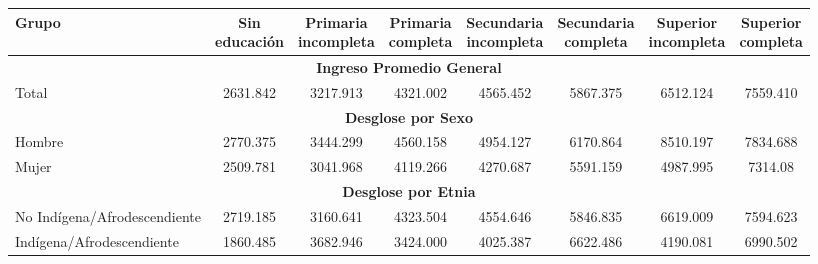 \begin{tabular}{lccccccc}
\toprule
\textbf{Grupo} & \makecell{\textbf{Sin} \\ \textbf{educación}} & \makecell{\textbf{Primaria} \\ \textbf{incompleta}} & \makecell{\textbf{Primaria} \\ \textbf{completa}} & \makecell{\textbf{Secundaria} \\ \textbf{incompleta}} & \makecell{\textbf{Secundaria} \\ \textbf{completa}} & \makecell{\textbf{Superior} \\ \textbf{incompleta}} & \makecell{\textbf{Superior} \\ \textbf{completa}} \\
\midrule
\multicolumn{8}{c}{\textbf{Ingreso Promedio General}} \\
\midrule
Total & 2631.842 & 3217.913 & 4321.002 & 4565.452 & 5867.375 & 6512.124 & 7559.410 \\
\midrule
\multicolumn{8}{c}{\textbf{Desglose por Sexo}} \\
\midrule
Hombre & 2770.375 & 3444.299 & 4560.158 & 4954.127 & 6170.864 & 8510.197 & 7834.688 \\
Mujer & 2509.781 & 3041.968 & 4119.266 & 4270.687 & 5591.159 & 4987.995 & 7314.08 \\
\midrule
\multicolumn{8}{c}{\textbf{Desglose por Etnia}} \\
\midrule
No Indígena/Afrodescendiente & 2719.185 & 3160.641 & 4323.504 & 4554.646 & 5846.835 & 6619.009 & 7594.623 \\
Indígena/Afrodescendiente & 1860.485 & 3682.946 & 3424.000 & 4025.387 & 6622.486 & 4190.081 & 6990.502 \\
\bottomrule
\end{tabular}
